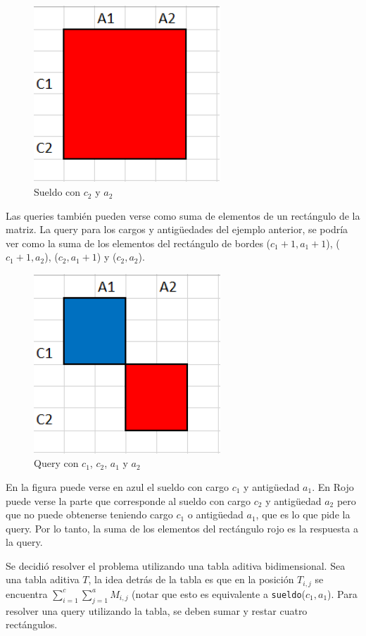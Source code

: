 \begin{figure}[H]
\centering
\includegraphics[width=7cm]{Imagenes/Ej3c.png}
\caption{Sueldo con $c_2$ y $a_2$}
\end{figure}

Las queries también pueden verse como suma de elementos de un rectángulo de la matriz. La query para los cargos y antigüedades del ejemplo anterior, se podría ver como la suma de los elementos del rectángulo de bordes ($c_1+1,a_1+1$), ($c_1+1,a_2$), ($c_2,a_1+1$) y ($c_2,a_2$).

\begin{figure}[H]
\centering
\includegraphics[width=7cm]{Imagenes/Ej3a.png}
\caption{Query con $c_1$, $c_2$, $a_1$ y $a_2$}
\end{figure}

En la figura puede verse en azul el sueldo con cargo $c_1$ y antigüedad $a_1$. En Rojo puede verse la parte que corresponde al sueldo con cargo $c_2$ y antigüedad $a_2$ pero que no puede obtenerse teniendo cargo $c_1$ o antigüedad $a_1$, que es lo que pide la query. Por lo tanto, la suma de los elementos del rectángulo rojo es la respuesta a la query.

Se decidió resolver el problema utilizando una tabla aditiva bidimensional. Sea una tabla aditiva $T$, la idea detrás de la tabla es que en la posición $T_{i,j}$ se encuentra $\sum_{i=1}^{c} \sum_{j=1}^{a} M_{i,j}$ (notar que esto es equivalente a \texttt{sueldo}($c_1,a_1$). Para resolver una query utilizando la tabla, se deben sumar y restar cuatro rectángulos.

